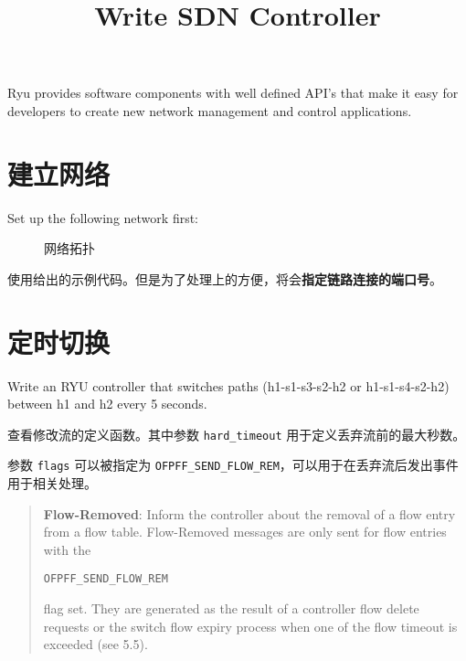 \endofdump
\usetikzlibrary{quotes}

    \title{Write SDN Controller}
    \maketitle
    \tableofcontents
    \vfill
    Ryu provides software components with well defined API's that make it easy for developers to create new network management and control applications.
    \vfill
    \clearpage
    \section{建立网络}
    Set up the following network first:
    
    \hfill
    
    \begin{figure}[H]
        \centering
        
        \caption{网络拓扑}\label{fig:topo}
    \end{figure}

    使用给出的示例代码。但是为了处理上的方便，将会\textbf{指定链路连接的端口号}。

    \section{定时切换}
    Write an RYU controller that switches paths (h1-s1-s3-s2-h2 or h1-s1-s4-s2-h2) between h1 and h2 every 5 seconds. 

    查看修改流的定义函数。其中参数 \texttt{hard\_timeout} 用于定义丢弃流前的最大秒数。

    
    参数 \texttt{flags} 可以被指定为 \texttt{OFPFF\_SEND\_FLOW\_REM}，可以用于在丢弃流后发出事件用于相关处理。

    \begin{quotation}
    \textbf{Flow-Removed}: Inform the controller about the removal of a flow entry from a flow table. Flow-Removed messages are only sent for flow entries with the 
    \begin{center}
        \verb"OFPFF_SEND_FLOW_REM"
    \end{center} flag set. They are
generated as the result of a controller flow delete requests or the switch flow expiry process when one of the
flow timeout is exceeded (see 5.5).\cite{openflow13}
    \end{quotation}

